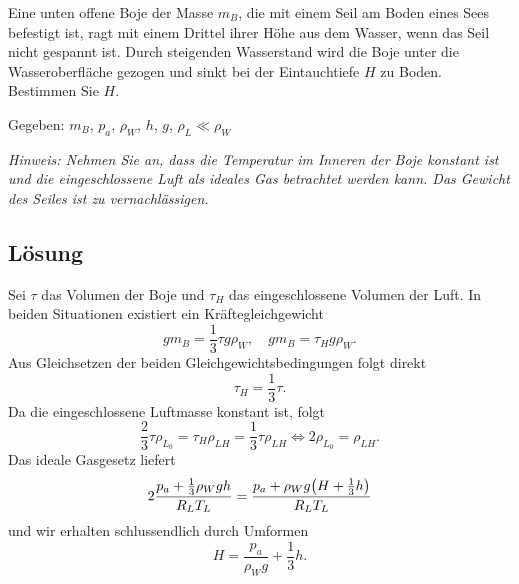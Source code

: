 \documentclass{exercise}
\begin{document}
    \begin{problem}
        Eine unten offene Boje der Masse \(m_B\), die mit einem Seil am Boden eines Sees befestigt ist, ragt mit einem Drittel ihrer Höhe aus dem Wasser, wenn das Seil nicht gespannt ist.
        Durch steigenden Wasserstand wird die Boje unter die Wasseroberfläche gezogen und sinkt bei der Eintauchtiefe \(H\) zu Boden.
        Bestimmen Sie \(H\).

        Gegeben: \(m_B\), \(p_a\), \(\rho_W\), \(h\), \(g\), \(\rho_L \ll \rho_W\)

        \emph{Hinweis: Nehmen Sie an, dass die Temperatur im Inneren der Boje konstant ist und die eingeschlossene Luft als ideales Gas betrachtet werden kann. Das Gewicht des Seiles ist zu vernachlässigen.}
    \end{problem}
    
    \subsection*{Lösung}
    Sei \(\tau\) das Volumen der Boje und \(\tau_H\) das eingeschlossene Volumen der Luft.
    In beiden Situationen existiert ein Kräftegleichgewicht
    \[
        gm_B = \frac{1}{3}\tau g\rho_W, \quad gm_B = \tau_H g\rho_W.
    \]
    Aus Gleichsetzen der beiden Gleichgewichtsbedingungen folgt direkt
    \[
        \tau_H = \frac{1}{3}\tau.
    \]
    Da die eingeschlossene Luftmasse konstant ist, folgt
    \[
        \frac{2}{3}\tau\rho_{L_0} = \tau_H\rho_{LH} = \frac{1}{3}\tau\rho_{LH} \iff 2\rho_{L_0} = \rho_{LH}.
    \]
    Das ideale Gasgesetz liefert
    \[
        2\frac{p_a + \frac{1}{3}\rho_W gh}{R_L T_L} = \frac{p_a + \rho_W g\parentheses*{H + \frac{1}{3}h}}{R_L T_L}
    \]
    und wir erhalten schlussendlich durch Umformen
    \[
        H = \frac{p_a}{\rho_W g} + \frac{1}{3}h.
    \]
\end{document}
